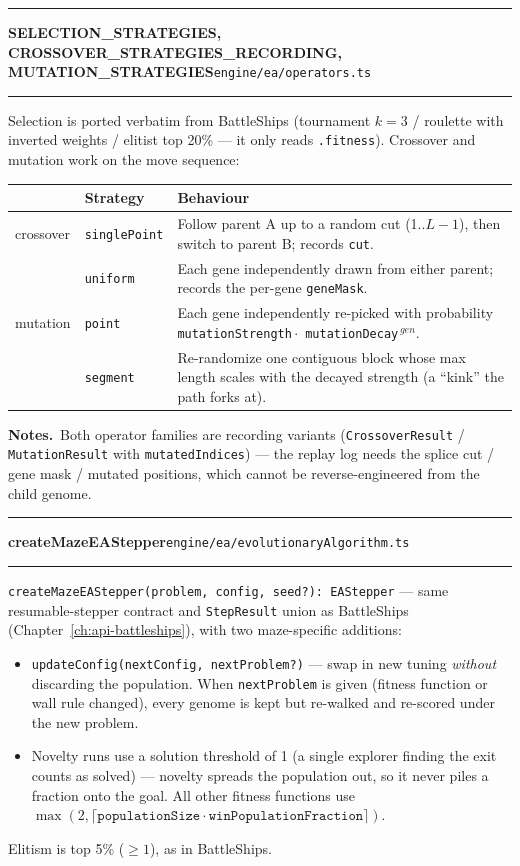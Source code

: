 \documentclass[11pt,a4paper]{report}
\newcommand{\srcfile}[1]{\texttt{\small #1}}   %
\newcommand{\ts}[1]{\texttt{#1}}               %
\newenvironment{apientry}[2]{%
  \par\medskip\noindent
  \begin{minipage}{\textwidth}
  \hrule\vspace{0.6ex}
  {\large\ttfamily\bfseries #1}\hfill{\footnotesize\srcfile{#2}}
  \vspace{0.4ex}\hrule\medskip
}{%
  \end{minipage}\par\medskip
}
\newcommand{\apifield}[1]{\par\smallskip\noindent\textbf{#1.}\ }
\begin{document}
\begin{apientry}{SELECTION\_STRATEGIES, CROSSOVER\_STRATEGIES\_RECORDING,
MUTATION\_STRATEGIES}{engine/ea/operators.ts}
Selection is ported verbatim from BattleShips (tournament $k = 3$ /
roulette with inverted weights / elitist top 20\% --- it only reads
\ts{.fitness}). Crossover and mutation work on the move sequence:
\begin{center}
\begin{tabularx}{\textwidth}{l l X}
  \toprule
  & \textbf{Strategy} & \textbf{Behaviour} \\
  \midrule
  crossover & \ts{singlePoint} & Follow parent A up to a random cut
              (1..$L{-}1$), then switch to parent B; records \ts{cut}. \\
            & \ts{uniform}     & Each gene independently drawn from either
              parent; records the per-gene \ts{geneMask}. \\
  mutation  & \ts{point}       & Each gene independently re-picked with
              probability \ts{mutationStrength}\,$\cdot$\,%
              \ts{mutationDecay}$^{\,gen}$. \\
            & \ts{segment}     & Re-randomize one contiguous block whose
              max length scales with the decayed strength (a ``kink'' the
              path forks at). \\
  \bottomrule
\end{tabularx}
\end{center}
\apifield{Notes}Both operator families are recording variants
(\ts{CrossoverResult} / \ts{MutationResult} with \ts{mutatedIndices}) ---
the replay log needs the splice cut / gene mask / mutated positions,
which cannot be reverse-engineered from the child genome.
\end{apientry}

\begin{apientry}{createMazeEAStepper}{engine/ea/evolutionaryAlgorithm.ts}
\ts{createMazeEAStepper(problem, config, seed?): EAStepper} --- same
resumable-stepper contract and \ts{StepResult} union as BattleShips
(Chapter~\ref{ch:api-battleships}), with two maze-specific additions:
\begin{itemize}[nosep]
  \item \ts{updateConfig(nextConfig, nextProblem?)} --- swap in new tuning
        \emph{without} discarding the population. When \ts{nextProblem}
        is given (fitness function or wall rule changed), every genome is
        kept but re-walked and re-scored under the new problem.
  \item Novelty runs use a solution threshold of 1 (a single explorer
        finding the exit counts as solved) --- novelty spreads the
        population out, so it never piles a fraction onto the goal. All
        other fitness functions use
        $\max(2, \lceil \ts{populationSize} \cdot
        \ts{winPopulationFraction} \rceil)$.
\end{itemize}
Elitism is top 5\% ($\geq 1$), as in BattleShips.
\end{apientry}
\end{document}
